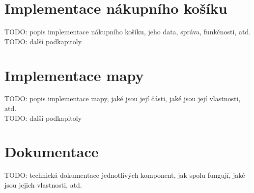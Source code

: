 \section{Implementace nákupního košíku}
\label{sec:implementace-kosik}
TODO: popis implementace nákupního košíku, jeho data, správa, funkčnosti, atd.\\
TODO: další podkapitoly

\section{Implementace mapy}
\label{sec:implementace-mapa}
TODO: popis implementace mapy, jaké jsou její části, jaké jsou její vlastnosti, atd.\\
TODO: další podkapitoly

\section{Dokumentace}
\label{sec:implementace-dokumentace}
TODO: technická dokumentace jednotlivých komponent, jak spolu fungují, jaké jsou jejich vlastnosti, atd.
